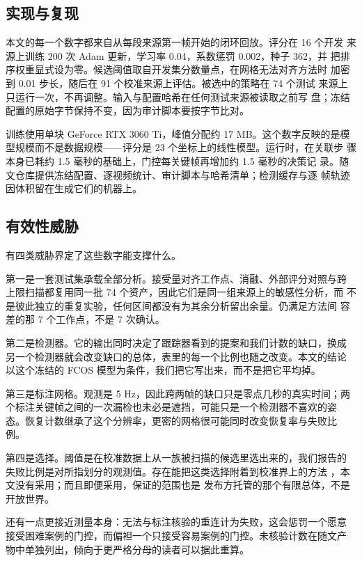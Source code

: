 \subsection{实现与复现}

本文的每一个数字都来自从每段来源第一帧开始的闭环回放。评分在 16 个开发
来源上训练 200 次 Adam 更新，学习率 0.04，系数惩罚 0.002，种子 362，并
把排序权重显式设为零。候选阈值取自开发集分数量点，在网格无法对齐方法时
加密到 0.01 步长，随后在 91 个校准来源上评估。被选中的策略在 74 个测试
来源上只运行一次，不再调整。输入与配置哈希在任何测试来源被读取之前写
盘；冻结配置的原始字节保持不变，因为审计脚本要按字节比对。

训练使用单块 GeForce RTX 3060 Ti，峰值分配约 17 MB。这个数字反映的是模
型规模而不是数据规模——评分是 23 个坐标上的线性模型。运行时，在关联步
骤本身已耗约 1.5 毫秒的基础上，门控每关键帧再增加约 1.5 毫秒的决策记
录。随文仓库提供冻结配置、逐视频统计、审计脚本与哈希清单；检测缓存与逐
帧轨迹因体积留在生成它们的机器上。

\subsection{有效性威胁}

有四类威胁界定了这些数字能支撑什么。

第一是一套测试集承载全部分析。接受量对齐工作点、消融、外部评分对照与跨
上限扫描都复用同一批 74 个资产，因此它们是同一组来源上的敏感性分析，而
不是彼此独立的重复实验，任何区间都没有为其余分析留出余量。仍满足方法间
容差的那 7 个工作点，不是 7 次确认。

第二是检测器。它的输出同时决定了跟踪器看到的提案和我们计数的缺口，换成
另一个检测器就会改变缺口的总体，表里的每一个比例也随之改变。本文的结论
以这个冻结的 FCOS 模型为条件，我们把它写出来，而不是把它平均掉。

第三是标注网格。观测是 5 Hz，因此跨两帧的缺口只是零点几秒的真实时间；两
个标注关键帧之间的一次漏检也未必是遮挡，可能只是一个检测器不喜欢的姿
态。恢复计数继承了这个分辨率，更密的网格很可能同时改变恢复率与失败比
例。

第四是选择。阈值是在校准数据上从一族被扫描的候选里选出来的，我们报告的
失败比例是对所指划分的观测值。存在能把这类选择附着到校准界上的方法
\cite{angelopoulos2021learn}，本文没有采用；而且即便采用，保证的范围也是
发布方托管的那个有限总体，不是开放世界。

还有一点更接近测量本身：无法与标注核验的重连计为失败，这会惩罚一个愿意
接受困难案例的门控，而偏袒一个只接受容易案例的门控。未核验计数在随文产
物中单独列出，倾向于更严格分母的读者可以据此重算。
